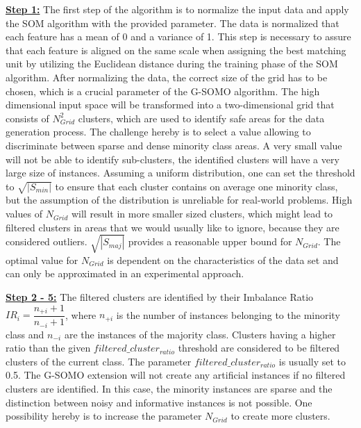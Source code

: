 \documentclass[parskip=full]{scrartcl}
\begin{document}
\textbf{\underline{Step 1:}} The first step of the algorithm is to normalize the
input data and apply the SOM algorithm with the provided parameter. The data is
normalized that each feature has a mean of 0 and a variance of 1.  This step is
necessary to assure that each feature is aligned on the same scale when
assigning the best matching unit by utilizing the Euclidean distance during the
training phase of the SOM algorithm. After normalizing the data, the correct
size of the grid has to be chosen, which is a crucial parameter of the G-SOMO
algorithm. The high dimensional input space will be transformed into a
two-dimensional grid that consists of $N_{Grid}^2$ clusters, which are used to
identify safe areas for the data generation process. The challenge hereby is to
select a value allowing to discriminate between sparse and dense minority class
areas.  A very small value will not be able to identify sub-clusters, the
identified clusters will have a very large size of instances. Assuming a uniform
distribution, one can set the threshold to  $\sqrt{|S_{min}|}$ to ensure that
each cluster contains on average one minority class,  but the assumption of the
distribution is unreliable for real-world problems. High values of $N_{Grid}$
will result in more smaller sized clusters, which might lead to filtered
clusters in areas that we would usually like to ignore, because they are
considered outliers. $\sqrt{|S_{maj}|}$ provides a reasonable upper bound for
$N_{Grid}$. The optimal value for $N_{Grid}$ is dependent on the characteristics
of the data set and can only be approximated in an experimental approach.

\textbf{\underline{Step 2 - 5:}} The filtered clusters are identified by their
Imbalance Ratio $IR_{i} = \dfrac{n_{+i} +1}{n_{-i} +1}$, where $n_{+i}$ is the
number of instances belonging to the minority class and $n_{-i}$ are the
instances of the majority class. Clusters having a higher ratio than the given
$filtered\_cluster_{ratio}$ threshold are considered to be filtered clusters of
the current class. The parameter $filtered\_cluster_{ratio}$ is usually set to
0.5. The G-SOMO extension will not create any artificial instances if no
filtered clusters are identified. In this case, the minority instances are
sparse and the distinction between noisy and informative instances is not
possible. One possibility hereby is to increase the parameter $N_{Grid}$ to
create more clusters. 
\end{document}

